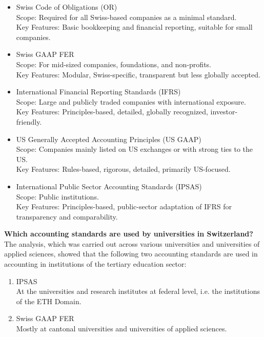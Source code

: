 \documentclass[10pt]{article}
\begin{document}
\begin{itemize}
    \item Swiss Code of Obligations (OR)\\
Scope: Required for all Swiss-based companies as a minimal standard.\\
Key Features: Basic bookkeeping and financial reporting, suitable for small companies.

    \item Swiss GAAP FER\\
Scope: For mid-sized companies, foundations, and non-profits.\\
Key Features: Modular, Swiss-specific, transparent but less globally accepted.

    \item International Financial Reporting Standards (IFRS)\\
Scope: Large and publicly traded companies with international exposure.\\
Key Features: Principles-based, detailed, globally recognized, investor-friendly.

    \item US Generally Accepted Accounting Principles (US GAAP) \\
Scope: Companies mainly listed on US exchanges or with strong ties to the US.\\
Key Features: Rules-based, rigorous, detailed, primarily US-focused.

    \item International Public Sector Accounting Standards (IPSAS)\\
Scope: Public institutions.\\
Key Features: Principles-based, public-sector adaptation of IFRS for transparency and comparability.

\end{itemize}

\textbf{Which accounting standards are used by universities in Switzerland?}\\
The analysis, which was carried out across various universities and universities of applied sciences, showed that the following two accounting standards are used in accounting in institutions of the tertiary education sector:

\begin{enumerate}
    \item IPSAS\\
At the universities and research institutes at federal level, i.e. the institutions of the ETH Domain.

    \item Swiss GAAP FER\\
Mostly at cantonal universities and universities of applied sciences.

\end{enumerate}
\end{document}
